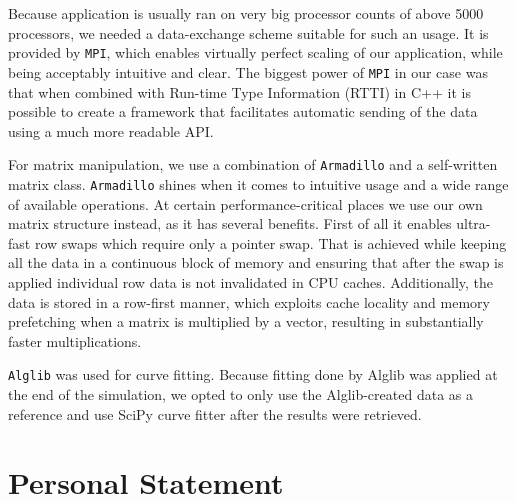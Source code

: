 \documentclass[11pt,a4paper]{article}
\begin{document}
\begin{appendices}
    Because application is usually ran on very big processor counts of above 5000 processors, we needed a data-exchange scheme suitable for such an usage.
    It is provided by \texttt{MPI}\cite{richard06}, which enables virtually perfect scaling of our application, while being acceptably intuitive and clear.
    The biggest power of \texttt{MPI} in our case was that when combined with Run-time Type Information (RTTI) in C++ it is possible to create a framework that facilitates automatic sending of the data using a much more readable API.

    For matrix manipulation, we use a combination of \texttt{Armadillo}\cite{Sanderson10} and a self-written matrix class.
    \texttt{Armadillo} shines when it comes to intuitive usage and a wide range of available operations.
    At certain performance-critical places we use our own matrix structure instead, as it has several benefits.
    First of all it enables ultra-fast row swaps which require only a pointer swap.
    That is achieved while keeping all the data in a continuous block of memory and ensuring that after the swap is applied individual row data is not invalidated in CPU caches.
    Additionally, the data is stored in a row-first manner, which exploits cache locality and memory prefetching when a matrix is multiplied by a vector, resulting in substantially faster multiplications.

    \texttt{Alglib} was used for curve fitting.
    Because fitting done by Alglib was applied at the end of the simulation, we opted to only use the Alglib-created data as a reference and use SciPy curve fitter after the results were retrieved.

    \section{Personal Statement}


\end{appendices}
\end{document}
